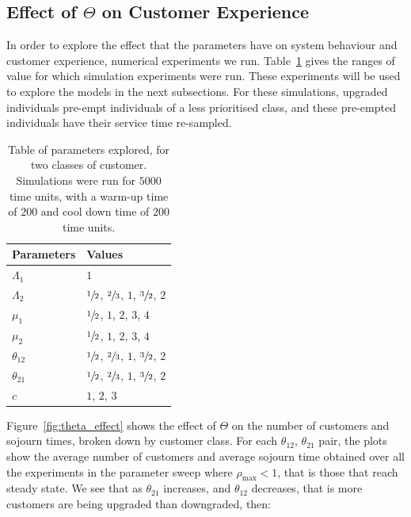 \documentclass{article}
\begin{document}
\subsection{Effect of $\Theta$ on Customer Experience}\label{sec:behaviour}
In order to explore the effect that the parameters have on system behaviour and
customer experience, numerical experiments we run.
Table~\ref{tbl:parameter_sweep} gives the ranges of value for which simulation
experiments were run. These experiments will be used to explore the models in
the next subsections. For these simulations, upgraded individuals pre-empt
individuals of a less prioritised class, and these pre-empted individuals have
their service time re-sampled.

\begin{table}
\begin{center}
\begin{tabular}{ll}
\toprule
Parameters & Values \\
\midrule
$\Lambda_1$ & $1$ \\
$\Lambda_2$ & $\sfrac{1}{2}$, $\sfrac{2}{3}$, $1$, $\sfrac{3}{2}$, $2$ \\
$\mu_1$ & $\sfrac{1}{2}$, $1$, $2$, $3$, $4$ \\
$\mu_2$ & $\sfrac{1}{2}$, $1$, $2$, $3$, $4$ \\
$\theta_{12}$ & $\sfrac{1}{2}$, $\sfrac{2}{3}$, $1$, $\sfrac{3}{2}$, $2$ \\
$\theta_{21}$ & $\sfrac{1}{2}$, $\sfrac{2}{3}$, $1$, $\sfrac{3}{2}$, $2$ \\
$c$ & $1$, $2$, $3$ \\
\bottomrule
\end{tabular}
\caption{Table of parameters explored, for two classes of customer. Simulations
         were run for $5000$ time units, with a warm-up time of $200$ and cool
         down time of $200$ time units.}
\label{tbl:parameter_sweep}
\end{center}
\end{table}

Figure~\ref{fig:theta_effect} shows the effect of $\Theta$ on the number of
customers and sojourn times, broken down by customer class. For each
$\theta_{12}$, $\theta_{21}$ pair, the plots show the average number of
customers and average sojourn time obtained over all the experiments in the
parameter sweep where $\rho_{\max} < 1$, that is those that reach steady state.
We see that as $\theta_{21}$ increases, and $\theta_{12}$ decreases, that is
more customers are being upgraded than downgraded, then:
\end{document}
